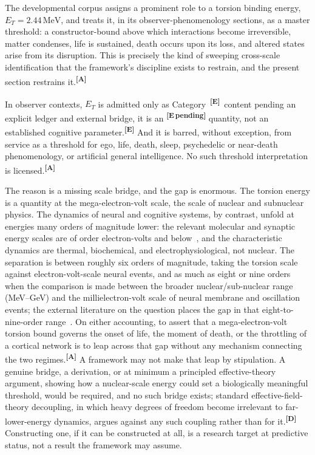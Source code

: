 \documentclass[12pt,a4paper,twoside]{article}
\theoremstyle{plain}
\theoremstyle{definition}
\theoremstyle{remark}
\newcommand{\MeV}{\,\mathrm{MeV}}
\newcommand{\catmark}[1]{\textsuperscript{\textsf{\textbf{[#1]}}}}
\newcommand{\ETorsion}{2.44\MeV} %
\begin{document}
The developmental corpus assigns a prominent role to a torsion binding energy, $E_T = \ETorsion$, and treats it, in its observer-phenomenology sections, as a master threshold: a constructor-bound above which interactions become irreversible, matter condenses, life is sustained, death occurs upon its loss, and altered states arise from its disruption. This is precisely the kind of sweeping cross-scale identification that the framework's discipline exists to restrain, and the present section restrains it.\catmark{A}

In observer contexts, $E_T$ is admitted only as Category~\catmark{E}\ content pending an explicit ledger and external bridge, it is an \catmark{E\,pending} quantity, not an established cognitive parameter.\catmark{E} And it is barred, without exception, from service as a threshold for ego, life, death, sleep, psychedelic or near-death phenomenology, or artificial general intelligence. No such threshold interpretation is licensed.\catmark{A}

The reason is a missing scale bridge, and the gap is enormous. The torsion energy is a quantity at the mega-electron-volt scale, the scale of nuclear and subnuclear physics. The dynamics of neural and cognitive systems, by contrast, unfold at energies many orders of magnitude lower: the relevant molecular and synaptic energy scales are of order electron-volts and below~\cite{attwell2001,harris2012,levy2021}, and the characteristic dynamics are thermal, biochemical, and electrophysiological, not nuclear. The separation is between roughly six orders of magnitude, taking the torsion scale against electron-volt-scale neural events, and as much as eight or nine orders when the comparison is made between the broader nuclear/sub-nuclear range (MeV--GeV) and the millielectron-volt scale of neural membrane and oscillation events; the external literature on the question places the gap in that eight-to-nine-order range~\cite{appelquist1975}. On either accounting, to assert that a mega-electron-volt torsion bound governs the onset of life, the moment of death, or the throttling of a cortical network is to leap across that gap without any mechanism connecting the two regimes.\catmark{A} A framework may not make that leap by stipulation. A genuine bridge, a derivation, or at minimum a principled effective-theory argument, showing how a nuclear-scale energy could set a biologically meaningful threshold, would be required, and no such bridge exists; standard effective-field-theory decoupling, in which heavy degrees of freedom become irrelevant to far-lower-energy dynamics, argues against any such coupling rather than for it.\catmark{D} Constructing one, if it can be constructed at all, is a research target at predictive status, not a result the framework may assume.
\end{document}
